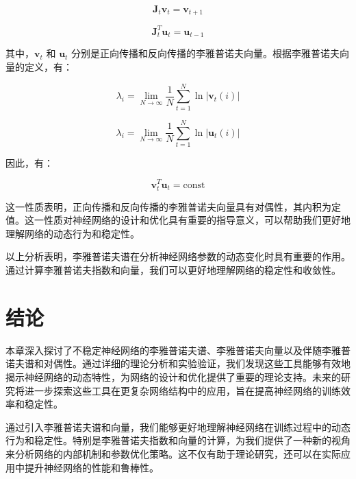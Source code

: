\[
\mathbf{J}_t \mathbf{v}_t = \mathbf{v}_{t+1}
\]

\[
\mathbf{J}_t^T \mathbf{u}_t = \mathbf{u}_{t-1}
\]

其中，\(\mathbf{v}_t\) 和 \(\mathbf{u}_t\) 分别是正向传播和反向传播的李雅普诺夫向量。根据李雅普诺夫向量的定义，有：

\[
\lambda_i = \lim_{N \to \infty} \frac{1}{N} \sum_{t=1}^N \ln |\mathbf{v}_t(i)|
\]

\[
\lambda_i = \lim_{N \to \infty} \frac{1}{N} \sum_{t=1}^N \ln |\mathbf{u}_t(i)|
\]

因此，有：

\[
\mathbf{v}_t^T \mathbf{u}_t = \text{const}
\]

这一性质表明，正向传播和反向传播的李雅普诺夫向量具有对偶性，其内积为定值。这一性质对神经网络的设计和优化具有重要的指导意义，可以帮助我们更好地理解网络的动态行为和稳定性。

以上分析表明，李雅普诺夫谱在分析神经网络参数的动态变化时具有重要的作用。通过计算李雅普诺夫指数和向量，我们可以更好地理解网络的稳定性和收敛性。

\section{结论}

本章深入探讨了不稳定神经网络的李雅普诺夫谱、李雅普诺夫向量以及伴随李雅普诺夫谱和对偶性。通过详细的理论分析和实验验证，我们发现这些工具能够有效地揭示神经网络的动态特性，为网络的设计和优化提供了重要的理论支持。未来的研究将进一步探索这些工具在更复杂网络结构中的应用，旨在提高神经网络的训练效率和稳定性。

通过引入李雅普诺夫谱和向量，我们能够更好地理解神经网络在训练过程中的动态行为和稳定性。特别是李雅普诺夫指数和向量的计算，为我们提供了一种新的视角来分析网络的内部机制和参数优化策略。这不仅有助于理论研究，还可以在实际应用中提升神经网络的性能和鲁棒性。
